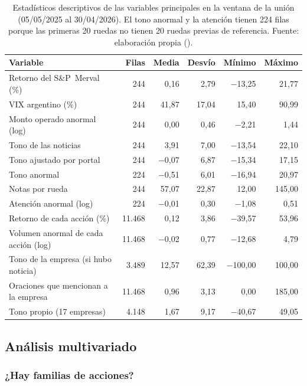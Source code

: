 \begin{table}[H]
\centering\small
\begin{tabular}{@{}lrrrrr@{}}
\toprule
\textbf{Variable} & \textbf{Filas} & \textbf{Media} & \textbf{Desvío} & \textbf{Mínimo} & \textbf{Máximo} \\
\midrule
Retorno del S\&P~Merval (\%) & 244 & 0,16 & 2,79 & $-$13,25 & 21,77 \\
VIX argentino (\%) & 244 & 41,87 & 17,04 & 15,40 & 90,99 \\
Monto operado anormal (log) & 244 & 0,00 & 0,46 & $-$2,21 & 1,44 \\
Tono de las noticias & 244 & 3,91 & 7,00 & $-$13,54 & 22,10 \\
Tono ajustado por portal & 244 & $-$0,07 & 6,87 & $-$15,34 & 17,15 \\
Tono anormal & 224 & $-$0,51 & 6,01 & $-$16,94 & 20,97 \\
Notas por rueda & 244 & 57,07 & 22,87 & 12,00 & 145,00 \\
Atención anormal (log) & 224 & $-$0,01 & 0,30 & $-$1,08 & 0,51 \\
Retorno de cada acción (\%) & 11.468 & 0,12 & 3,86 & $-$39,57 & 53,96 \\
Volumen anormal de cada acción (log) & 11.468 & $-$0,02 & 0,77 & $-$12,68 & 4,79 \\
Tono de la empresa (si hubo noticia) & 3.489 & 12,57 & 62,39 & $-$100,00 & 100,00 \\
Oraciones que mencionan a la empresa & 11.468 & 0,96 & 3,13 & 0,00 & 185,00 \\
Tono propio (17 empresas) & 4.148 & 1,67 & 9,17 & $-$40,67 & 49,05 \\
\bottomrule
\end{tabular}
\caption{Estadísticos descriptivos de las variables principales en la ventana de la unión
(05/05/2025 al 30/04/2026). El tono anormal y la atención tienen 224 filas porque las primeras
20 ruedas no tienen 20 ruedas previas de referencia. Fuente: elaboración propia
().}
\label{tab:descriptivos}
\end{table}

\subsection{Análisis multivariado}
\label{sec:multivariado}

\subsubsection{¿Hay familias de acciones?}

